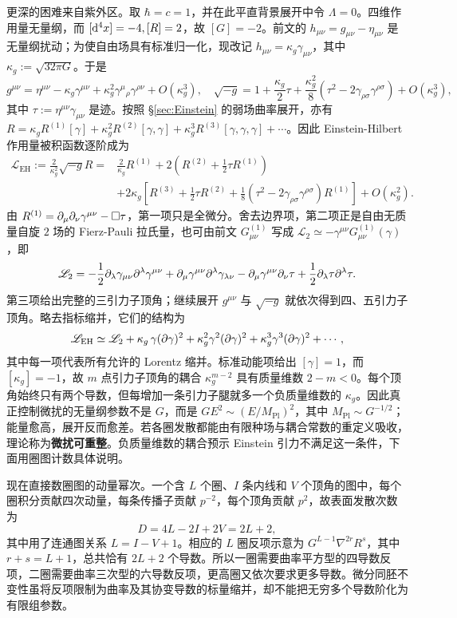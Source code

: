 更深的困难来自紫外区。取 $\hbar=c=1$，并在此平直背景展开中令 $\Lambda=0$。四维作用量无量纲，而 $[\dd^4x]=-4,[R]=2$，故 $[G]=-2$。前文的 $h_{\mu\nu}=g_{\mu\nu}-\eta_{\mu\nu}$ 是无量纲扰动；为使自由场具有标准归一化，现改记 $h_{\mu\nu}=\kappa_g\gamma_{\mu\nu}$，其中 $\kappa_g:=\sqrt{32\pi G}$。于是
\[
    g^{\mu\nu}=\eta^{\mu\nu}-\kappa_g\gamma^{\mu\nu}
       +\kappa_g^2\gamma^\mu{}_\rho\gamma^{\rho\nu}+O(\kappa_g^3),
    \quad
    \sqrt{-g}=1+\frac{\kappa_g}{2}\tau
       +\frac{\kappa_g^2}{8}\left(\tau^2-2\gamma_{\rho\sigma}\gamma^{\rho\sigma}\right)
       +O(\kappa_g^3),
\]
其中 $\tau:=\eta^{\mu\nu}\gamma_{\mu\nu}$ 是迹。按照 \S\ref{sec:Einstein} 的弱场曲率展开，亦有 $R=\kappa_gR^{(1)}[\gamma]+\kappa_g^2R^{(2)}[\gamma,\gamma]+\kappa_g^3R^{(3)}[\gamma,\gamma,\gamma]+\cdots$。因此 Einstein-Hilbert 作用量被积函数逐阶成为
\begin{align*}
    \mathscr L_{\mathrm{EH}}:=\frac{2}{\kappa_g^2}\sqrt{-g}R
    ={}&\frac{2}{\kappa_g}R^{(1)}
    +2\left(R^{(2)}+\frac12\tau R^{(1)}\right)\\
    &+2\kappa_g\left[R^{(3)}+\frac12\tau R^{(2)}
      +\frac18\left(\tau^2-2\gamma_{\rho\sigma}\gamma^{\rho\sigma}\right)R^{(1)}\right]
    +O(\kappa_g^2).
\end{align*}
由 $R^{(1)}=\partial_\mu\partial_\nu\gamma^{\mu\nu}-\square\tau$，第一项只是全微分。舍去边界项，第二项正是自由无质量自旋 $2$ 场的 Fierz-Pauli 拉氏量，也可由前文 $G_{\mu\nu}^{(1)}$ 写成 $\mathscr L_2\simeq-\gamma^{\mu\nu}G_{\mu\nu}^{(1)}(\gamma)$，即
\[
    \mathscr L_2=-\frac12\partial_\lambda\gamma_{\mu\nu}\partial^\lambda\gamma^{\mu\nu}
      +\partial_\mu\gamma^{\mu\nu}\partial^\lambda\gamma_{\lambda\nu}
      -\partial_\mu\gamma^{\mu\nu}\partial_\nu\tau
      +\frac12\partial_\lambda\tau\partial^\lambda\tau.
\]
第三项给出完整的三引力子顶角；继续展开 $g^{\mu\nu}$ 与 $\sqrt{-g}$ 就依次得到四、五引力子顶角。略去指标缩并，它们的结构为
\[
    \mathscr L_{\mathrm{EH}}\simeq\mathscr L_2
      +\kappa_g\,\gamma(\partial\gamma)^2
      +\kappa_g^2\gamma^2(\partial\gamma)^2
      +\kappa_g^3\gamma^3(\partial\gamma)^2+\cdots,
\]
其中每一项代表所有允许的 Lorentz 缩并。标准动能项给出 $[\gamma]=1$，而 $[\kappa_g]=-1$，故 $m$ 点引力子顶角的耦合 $\kappa_g^{m-2}$ 具有质量维数 $2-m<0$。每个顶角始终只有两个导数，但每增加一条引力子腿就多一个负质量维数的 $\kappa_g$。因此真正控制微扰的无量纲参数不是 $G$，而是 $GE^2\sim(E/M_{\mathrm{Pl}})^2$，其中 $M_{\mathrm{Pl}}\sim G^{-1/2}$；能量愈高，展开反而愈差。若各圈发散都能由有限种场与耦合常数的重定义吸收，理论称为\textbf{微扰可重整}。负质量维数的耦合预示 Einstein 引力不满足这一条件，下面用圈图计数具体说明。

现在直接数圈图的动量幂次。一个含 $L$ 个圈、$I$ 条内线和 $V$ 个顶角的图中，每个圈积分贡献四次动量，每条传播子贡献 $p^{-2}$，每个顶角贡献 $p^2$，故表面发散次数为
\[
    D=4L-2I+2V=2L+2,
\]
其中用了连通图关系 $L=I-V+1$。相应的 $L$ 圈反项示意为 $G^{L-1}\nabla^{2r}R^s$，其中 $r+s=L+1$，总共恰有 $2L+2$ 个导数。所以一圈需要曲率平方型的四导数反项，二圈需要曲率三次型的六导数反项，更高圈又依次要求更多导数。微分同胚不变性虽将反项限制为曲率及其协变导数的标量缩并，却不能把无穷多个导数阶化为有限组参数。

